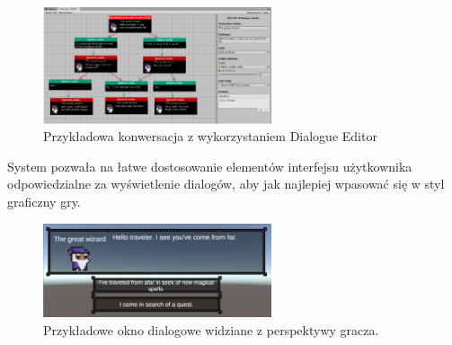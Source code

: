 \begin{figure}[h]
\centering
\includegraphics[width=0.6\textwidth]{images/dial}
\caption{Przykładowa konwersacja z wykorzystaniem Dialogue Editor}
\end{figure}
System pozwała na łatwe dostosowanie elementów interfejsu użytkownika odpowiedzialne za wyświetlenie dialogów, aby jak najlepiej wpasować się
w styl graficzny gry.

\begin{figure}[h]
\centering
\includegraphics[width=0.6\textwidth]{images/d}
\caption{Przykładowe okno dialogowe widziane z perspektywy gracza.}
\end{figure}
